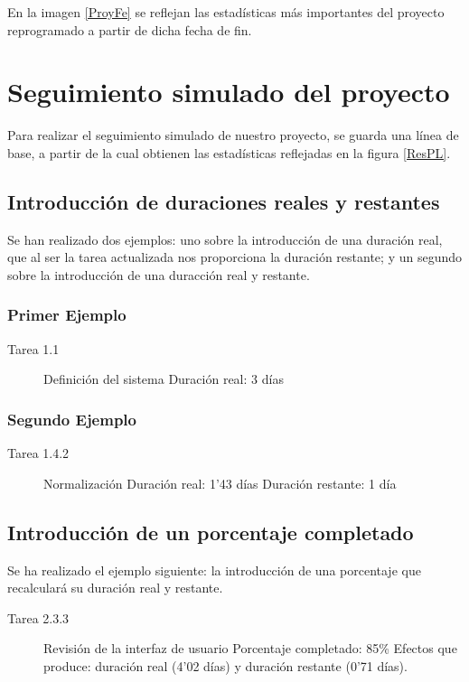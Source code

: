 \documentclass[11pt,a4paper,spanish,twoside]{book}
\begin{document}
En la imagen \ref{ProyFe} se reflejan las estadísticas más importantes del
proyecto reprogramado a partir de dicha fecha de fin.

\chapter{Seguimiento simulado del proyecto}
Para realizar el seguimiento simulado de nuestro proyecto, se guarda una línea 
de base, a partir de la cual obtienen las estadísticas reflejadas en la figura 
\ref{ResPL}.


\section{Introducción de duraciones reales y restantes}
Se han realizado dos ejemplos: uno sobre la introducción de una duración
real, que al ser la tarea actualizada nos proporciona la duración restante; y
un segundo sobre la introducción de una duracción real y restante.

\subsection{Primer Ejemplo}
\begin{description}
\item[Tarea 1.1] Definición del sistema \hfill
  Duración real: 3 días
\end{description}

\subsection{Segundo Ejemplo}
\begin{description}
\item[Tarea 1.4.2] Normalización \hfill
  Duración real: 1'43 días
  Duración restante: 1 día
\end{description}

\section{Introducción de un porcentaje completado}
Se ha realizado el ejemplo siguiente: la introducción de una porcentaje que 
recalculará su duración real y restante.

\begin{description}
\item[Tarea 2.3.3] Revisión de la interfaz de usuario
  Porcentaje completado: 85\%
  Efectos que produce: duración real (4'02 días) y duración restante 
(0'71 días).
\end{description}
\end{document}
